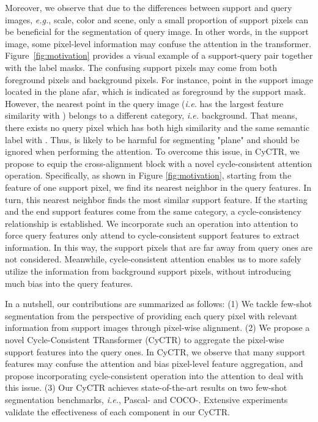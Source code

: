 \documentclass{article}
\begin{document}
Moreover, we observe that due to the differences between support and query images, \textit{e.g.}, scale, color and scene, only a small proportion of support pixels can be beneficial for the segmentation of query image. In other words, in the support image, some pixel-level information may confuse the attention in the transformer. Figure~\ref{fig:motivation} provides a visual example of a support-query pair together with the label masks. The confusing support pixels may come from both foreground pixels and background pixels. 
For instance, point  in the support image located in the plane afar, which is indicated as foreground by the support mask. However, 
the nearest point  in the query image (\emph{i.e.}  has the largest feature similarity with ) belongs to a different category, \emph{i.e.} background.  
That means, there exists no query pixel which has both high similarity and the same semantic label with .
Thus,  is likely to be harmful for segmenting "plane" and should be ignored when performing the attention. 
To overcome this issue, in CyCTR, we propose to equip the cross-alignment block with a novel cycle-consistent attention operation. 
Specifically, as shown in Figure \ref{fig:motivation}, starting from the feature of one support pixel, we find its nearest neighbor in the query features. 
In turn, this nearest neighbor finds the most similar support feature.
If the starting and the end support features come from the same category, a cycle-consistency relationship is established. 
We incorporate such an operation into attention to force query features only attend to cycle-consistent support features to extract information. 
In this way, the support pixels that are far away from query ones are not considered.
Meanwhile, cycle-consistent attention enables us to more safely utilize the information from background support pixels, 
without introducing much bias into the query features.



In a nutshell, our contributions are summarized as follows: 
(1) We tackle few-shot segmentation from the perspective of providing each query pixel with relevant information from support images through pixel-wise alignment.
(2) We propose a novel Cycle-Consistent TRansformer (CyCTR) to aggregate the pixel-wise support features into the query ones.
In CyCTR, we observe that many support features may confuse the attention and bias pixel-level feature aggregation, 
and propose incorporating cycle-consistent operation into the attention to deal with this issue. 
(3) Our CyCTR achieves state-of-the-art results on two few-shot segmentation benchmarks, \textit{i.e.}, Pascal- and COCO-. Extensive experiments validate the effectiveness of each component in our CyCTR. 
\end{document}
